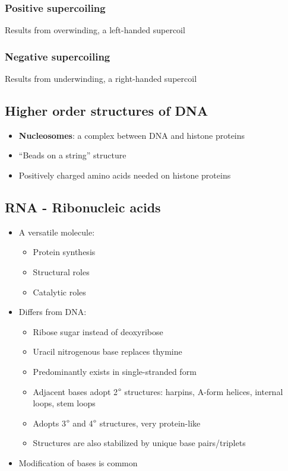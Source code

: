 \documentclass[letterpaper, 12pt]{article}
\begin{document}
\subsubsection*{Positive supercoiling}
Results from overwinding, a left-handed supercoil

\subsubsection*{Negative supercoiling}
Results from underwinding, a right-handed supercoil

\subsection*{Higher order structures of DNA}

\begin{itemize}
\item \textbf{Nucleosomes}: a complex between DNA and histone proteins
\item ``Beads on a string'' structure
\item Positively charged amino acids needed on histone proteins
\end{itemize}

\subsection*{RNA - Ribonucleic acids}
\begin{itemize}
\item A versatile molecule:
\begin{itemize}
\item Protein synthesis
\item Structural roles
\item Catalytic roles
\end{itemize}
\item Differs from DNA:
\begin{itemize}
\item Ribose sugar instead of deoxyribose
\item Uracil nitrogenous base replaces thymine
\item Predominantly exists in single-stranded form
\item Adjacent bases adopt 2$\degree$ structures: harpins, A-form helices, internal loops, stem loops
\item Adopts 3$\degree$ and 4$\degree$ structures, very protein-like
\item Structures are also stabilized by unique base pairs/triplets
\end{itemize}
\item Modification of bases is common
\end{itemize}
\end{document}

